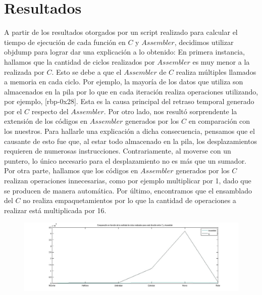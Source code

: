 \documentclass[10pt, a4paper]{article}
\begin{document}
\section{Resultados}
A partir de los resultados otorgados por un script realizado para calcular el tiempo de ejecución de cada función en $C$ y $Assembler$, decidimos utilizar objdump para lograr dar una explicación a lo obtenido:\newline
En primera instancia, hallamos que la cantidad de ciclos realizados por $Assembler$ es muy menor a la realizada por $C$. Esto se debe a que el $Assembler$ de $C$ realiza múltiples llamados a memoria en cada ciclo. Por ejemplo, la mayoría de los datos que utiliza son almacenados en la pila por lo que en cada iteración realiza operaciones utilizando, por ejemplo, [rbp-0x28]. Esta es la causa principal del retraso temporal generado por el $C$ respecto del $Assembler$. \newline 
Por otro lado, nos resultó sorprendente la extensión de los códigos en $Assembler$ generados por los $C$ en comparación con los nuestros. Para hallarle una explicación a dicha consecuencia, pensamos que el causante de esto fue que, al estar todo almacenado en la pila, los desplazamientos requieren de numerosas instrucciones. Contrariamente, al moverse con un puntero, lo único necesario para el desplazamiento no es más que un sumador. \newline
Por otra parte, hallamos que los códigos en $Assembler$ generados por los $C$ realizan operaciones innecesarias, como por ejemplo multiplicar por 1, dado que se producen de manera automática.\newline
Por último, encontramos que el ensamblado del $C$ no realiza empaquetamientos por lo que la cantidad de operaciones a realizar está multiplicada por 16.\newline
\begin{figure}[H] %
\begin{center}
\includegraphics[width=520pt]{./velocidad.jpg}
\end{center}
\end{figure}
\end{document}
